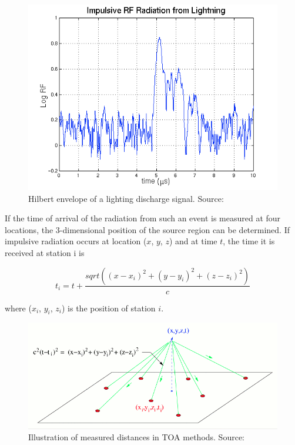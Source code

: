 \documentclass[twoside]{ctuthesis}
\theoremstyle{plain}
\theoremstyle{definition}
\theoremstyle{note}
\begin{document}
\begin{figure}
 \begin{center}
 \includegraphics[width=\linewidth]{./img/lightning_waveform.png}
 \caption{Hilbert envelope of a lighting discharge signal. Source: \cite{NMLMA} }
  \label{fig:lihting_discharge} 
 \end{center}
\end{figure}

If the time of arrival of the radiation from such an event is measured at four locations, the 3-dimensional position of the source region can be determined. If impulsive radiation occurs at location ($x$, $y$, $z$) and at time $t$, the time it is received at station i is 

\begin{equation}
t_i = t+ \frac{sqrt( (x-x_i)^2 + (y-y_i)^2 +(z-z_i)^2)}{c} \label{toa}
\end{equation}

where ($x_i$, $y_i$, $z_i$) is the position of station $i$. 

\begin{figure}
 \begin{center}
 \includegraphics[width=\linewidth]{./img/toa_fig.png}
 \caption{Illustration of measured distances in TOA methods. Source: \cite{NMLMA} }
  \label{fig:TOA_localization} 
 \end{center}
\end{figure}
\end{document}
